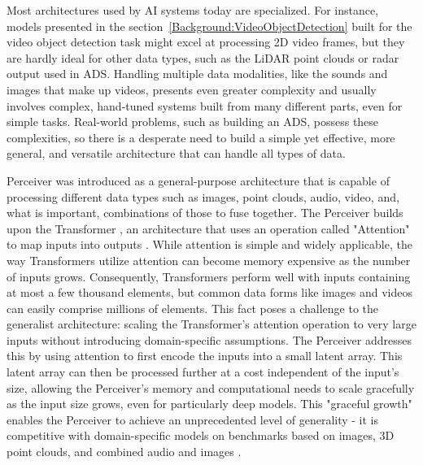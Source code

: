 Most architectures used by AI systems today are specialized. For instance, models presented in the section~\ref{Background:VideoObjectDetection} built for the video object detection task might excel at processing 2D video frames, but they are hardly ideal for other data types, such as the LiDAR point clouds or radar output used in ADS. Handling multiple data modalities, like the sounds and images that make up videos, presents even greater complexity and usually involves complex, hand-tuned systems built from many different parts, even for simple tasks. Real-world problems, such as building an ADS, possess these complexities, so there is a desperate need to build a simple yet effective, more general, and versatile architecture that can handle all types of data.

Perceiver \cite{jaeglePerceiverGeneralPerception2021} was introduced as a general-purpose architecture that is capable of processing different data types such as images, point clouds, audio, video, and, what is important, combinations of those to fuse together. The Perceiver builds upon the Transformer \cite{vaswaniAttentionAllYou2023}, an architecture that uses an operation called "Attention" to map inputs into outputs \cite{bahdanauNeuralMachineTranslation2016a}. While attention is simple and widely applicable, the way Transformers utilize attention can become memory expensive as the number of inputs grows. Consequently, Transformers perform well with inputs containing at most a few thousand elements, but common data forms like images and videos can easily comprise millions of elements. This fact poses a challenge to the generalist architecture: scaling the Transformer's attention operation to very large inputs without introducing domain-specific assumptions. The Perceiver addresses this by using attention to first encode the inputs into a small latent array. This latent array can then be processed further at a cost independent of the input's size, allowing the Perceiver's memory and computational needs to scale gracefully as the input size grows, even for particularly deep models. This "graceful growth" enables the Perceiver to achieve an unprecedented level of generality - it is competitive with domain-specific models on benchmarks based on images, 3D point clouds, and combined audio and images \cite{jaeglePerceiverGeneralPerception2021}.

